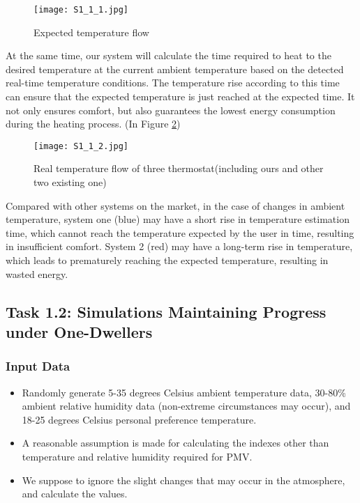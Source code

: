 \documentclass{mcmthesis}
\begin{document}
				\begin{figure}[h]
					\small
					\centering
					\texttt{[image: S1\_1\_1.jpg]}
					\caption{Expected temperature flow} \label{fig:1}
				\end{figure}
			
				At the same time, our system will calculate the time required to heat to the desired temperature at the current ambient temperature based on the detected real-time temperature conditions. The temperature rise according to this time can ensure that the expected temperature is just reached at the expected time. It not only ensures comfort, but also guarantees the lowest energy consumption during the heating process. (In Figure \ref{fig:1.2})
				
				\begin{figure}[h]
					\small
					\centering
					\texttt{[image: S1\_1\_2.jpg]}
					\caption{Real temperature flow of three thermostat(including ours and other two existing one)} \label{fig:1.2}
				\end{figure}
			
				Compared with other systems on the market, in the case of changes in ambient temperature, system one (blue) may have a short rise in temperature estimation time, which cannot reach the temperature expected by the user in time, resulting in insufficient comfort. System 2 (red) may have a long-term rise in temperature, which leads to prematurely reaching the expected temperature, resulting in wasted energy.
				
		\subsection{Task 1.2: Simulations Maintaining Progress under One-Dwellers}	
			\subsubsection{Input Data}
				\begin{itemize}
					\item Randomly generate 5-35 degrees Celsius ambient temperature data, 30-80\% ambient relative humidity data (non-extreme circumstances may occur), and 18-25 degrees Celsius personal preference temperature.
					
					\item A reasonable assumption is made for calculating the indexes other than temperature and relative humidity required for PMV. 
					
					\item We suppose to ignore the slight changes that may occur in the atmosphere, and calculate the values.
				\end{itemize}
\end{document}
